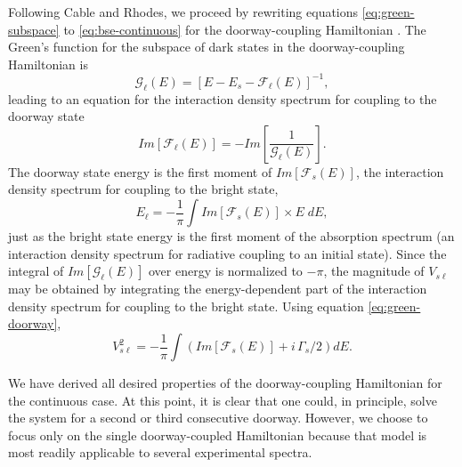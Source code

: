 \documentclass[12pt]{mitthesis}
\begin{document}
Following Cable and Rhodes, we proceed by rewriting equations
\ref{eq:green-subspace} to \ref{eq:bse-continuous} for the
doorway-coupling Hamiltonian \cite{cable80}.  The Green's function for
the subspace of dark states in the doorway-coupling Hamiltonian is
\begin{equation}
  \label{eq:green-doorway-subspace}
  \mathcal{G}_{\ell}(E) = [E - E_s - \mathcal{F}_{\ell}(E)]^{-1},
\end{equation}
leading to an equation for the interaction density spectrum for
coupling to the doorway state
\begin{equation}
  \label{eq:idf}
  Im[\mathcal{F}_{\ell}(E)] = - Im \left [
    \frac{1}{\mathcal{G}_{\ell}(E)}
  \right ].
\end{equation}
The doorway state energy is the first moment of
$Im[\mathcal{F}_{s}(E)]$, the interaction density spectrum for
coupling to the bright state,
\begin{equation}
  \label{eq:dse-continuous}
  E_{\ell} = - \frac{1}{\pi} \int Im[\mathcal{F}_s(E)] \times E \; dE,
\end{equation}
just as the bright state energy is the first moment of the absorption
spectrum (an interaction density spectrum for radiative coupling to an
initial state).  Since the integral of $Im[\mathcal{G}_{\ell}(E)]$
over energy is normalized to $-\pi$, the magnitude of $V_{s\ell}$ may
be obtained by integrating the energy-dependent part of the interaction
density spectrum for coupling to the bright state.  Using equation
\ref{eq:green-doorway},
\begin{equation}
  V_{s\ell}^2 = -\frac{1}{\pi} \int \left (
    Im[\mathcal{F}_s(E)] + i \, \Gamma_s / 2
  \right ) dE.
\end{equation}

We have derived all desired properties of the doorway-coupling
Hamiltonian for the continuous case.  At this point, it is clear that
one could, in principle, solve the system for a second or third
consecutive doorway.  However, we choose to focus only on the single
doorway-coupled Hamiltonian because that model is most readily
applicable to several experimental spectra.
\end{document}
